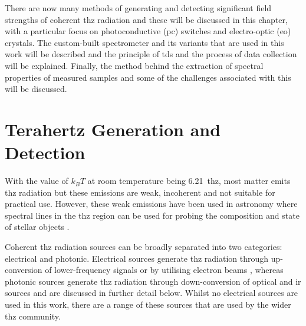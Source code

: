 There are now many methods of generating and detecting significant field strengths of coherent \acrshort{thz} radiation and these will be discussed in this chapter, with a particular focus on photoconductive (\acrshort{pc}) switches and electro\nobreakdash-optic (\acrshort{eo}) crystals. 
The custom\nobreakdash-built spectrometer and its variants that are used in this work will be described and the principle of \acrshort{tds} and the process of data collection will be explained. 
Finally, the method behind the extraction of spectral properties of measured samples and some of the challenges associated with this will be discussed.

\section{Terahertz Generation and Detection}
With the value of \(k_BT\) at room temperature being \SI{6.21}{\acrshort{thz}}, most matter emits \acrshort{thz} radiation but these emissions are weak, incoherent and not suitable for practical use. However, these weak emissions have been used in astronomy where spectral lines in the \acrshort{thz} region can be used for probing the composition and state of stellar objects \DIFdelbegin \DIFdel{~}\DIFdelend \cite{Stacey2011}.

Coherent \acrshort{thz} radiation sources can be broadly separated into two categories: electrical and photonic. Electrical sources generate \acrshort{thz} radiation through up\nobreakdash-conversion of lower\nobreakdash-frequency signals \DIFdelbegin \DIFdel{~}\DIFdelend \cite{Orihashi2005, Davies2002, Gold1998} or by utilising electron beams \DIFdelbegin \DIFdel{~}\DIFdelend \cite{He2013, Schmidt2002, Williams2002}, whereas photonic sources generate \acrshort{thz} radiation through down\nobreakdash-conversion of optical and \acrshort{ir} sources \DIFdelbegin \DIFdel{~}\DIFdelend \cite{McIntosh1995, Dai2011, Warren1991, Wu1995} \DIFdelbegin {}\DIFdelend and are discussed in further detail below. Whilst no electrical sources are used in this work, there are a range of these sources that are used by the wider \acrshort{thz} community. 

